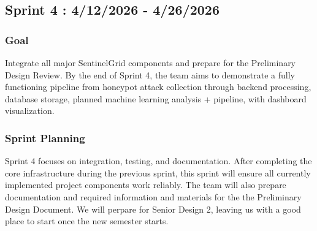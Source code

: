 \documentclass{article}
\begin{document}
\subsection{Sprint 4 : 4/12/2026 - 4/26/2026}
\subsubsection{Goal}
Integrate all major SentinelGrid components and prepare for the Preliminary Design Review. By the end of Sprint 4, the team aims to demonstrate a fully functioning pipeline from honeypot attack collection through backend processing, database storage, planned machine learning analysis + pipeline, with dashboard visualization.

\subsubsection{Sprint Planning}
Sprint 4 focuses on integration, testing, and documentation. After completing the core infrastructure during the previous sprint, this sprint will ensure all currently implemented project components work reliably. The team will also prepare documentation and required information and materials for the the Preliminary Design Document.
We will perpare for Senior Design 2, leaving us with a good place to start once the new semester starts.
\end{document}
